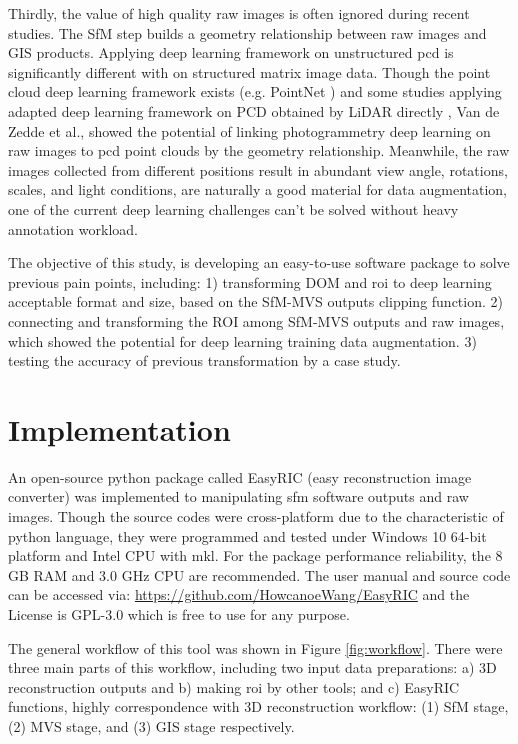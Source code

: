 \documentclass{configs/bmcart}
\begin{document}
Thirdly, the value of high quality raw images is often ignored during recent studies. The SfM step  builds a geometry relationship between raw images and GIS products. Applying deep learning framework on unstructured \acrfull*{pcd} is significantly different with on structured matrix image data. Though the point cloud deep learning framework exists (e.g. PointNet \cite{qi_pointnet_2017}) and some studies applying adapted deep learning framework on PCD obtained by LiDAR directly \cite{jin_deep_2018, jin_stemleaf_2019, jin_non-destructive_2020}, Van de Zedde et al., \cite{van_plant-part_2019} showed the potential of linking photogrammetry deep learning on raw images to \acrfull*{pcd} point clouds by the geometry relationship. Meanwhile, the raw images collected from different positions result in abundant view angle, rotations, scales, and light conditions, are naturally a good material for data augmentation, one of the current deep learning challenges can't be solved without heavy annotation workload.

The objective of this study, is developing an easy-to-use software package to solve previous pain points, including: 1) transforming DOM and \acrfull*{roi} to deep learning acceptable format and size, based on the SfM-MVS outputs clipping function. 2) connecting and transforming the ROI among SfM-MVS outputs and raw images, which showed the potential for deep learning training data augmentation. 3) testing the accuracy of previous transformation by a case study.

\section*{Implementation}

An open-source python package called EasyRIC (easy reconstruction image converter) was implemented to manipulating \acrshort*{sfm} software outputs and raw images. Though the source codes were cross-platform due to the characteristic of python language, they were programmed and tested under Windows 10 64-bit platform and Intel CPU with \acrfull*{mkl}. For the package performance reliability, the 8 GB RAM and 3.0 GHz CPU are recommended. The user manual and source code can be accessed via: \url{https://github.com/HowcanoeWang/EasyRIC} and the License is GPL-3.0 which is free to use for any purpose.

The general workflow of this tool was shown in Figure \ref{fig:workflow}. There were three main parts of this workflow, including two input data preparations: a) 3D reconstruction outputs and b) making \acrfull*{roi} by other tools; and c) EasyRIC functions, highly correspondence with 3D reconstruction workflow: (1) SfM stage, (2) MVS stage, and (3) GIS stage respectively. 
\end{document}
